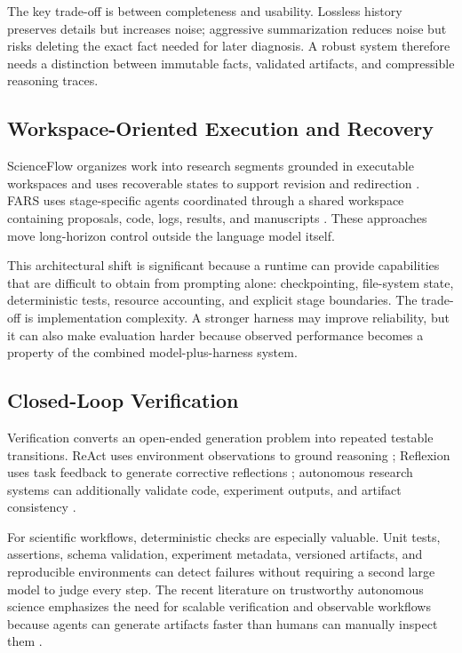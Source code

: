 \documentclass[manuscript,screen]{acmart}
\begin{document}
The key trade-off is between completeness and usability. Lossless history preserves details but increases noise; aggressive summarization reduces noise but risks deleting the exact fact needed for later diagnosis. A robust system therefore needs a distinction between immutable facts, validated artifacts, and compressible reasoning traces.

\subsection{Workspace-Oriented Execution and Recovery}
ScienceFlow organizes work into research segments grounded in executable workspaces and uses recoverable states to support revision and redirection \cite{zhao2026scienceflow}. FARS uses stage-specific agents coordinated through a shared workspace containing proposals, code, logs, results, and manuscripts \cite{tang2026fars}. These approaches move long-horizon control outside the language model itself.

This architectural shift is significant because a runtime can provide capabilities that are difficult to obtain from prompting alone: checkpointing, file-system state, deterministic tests, resource accounting, and explicit stage boundaries. The trade-off is implementation complexity. A stronger harness may improve reliability, but it can also make evaluation harder because observed performance becomes a property of the combined model-plus-harness system.

\subsection{Closed-Loop Verification}
Verification converts an open-ended generation problem into repeated testable transitions. ReAct uses environment observations to ground reasoning \cite{yao2023react}; Reflexion uses task feedback to generate corrective reflections \cite{shinn2023reflexion}; autonomous research systems can additionally validate code, experiment outputs, and artifact consistency \cite{lu2024aiscientist,tang2026fars}.

For scientific workflows, deterministic checks are especially valuable. Unit tests, assertions, schema validation, experiment metadata, versioned artifacts, and reproducible environments can detect failures without requiring a second large model to judge every step. The recent literature on trustworthy autonomous science emphasizes the need for scalable verification and observable workflows because agents can generate artifacts faster than humans can manually inspect them \cite{mo2026trustscience}.
\end{document}
